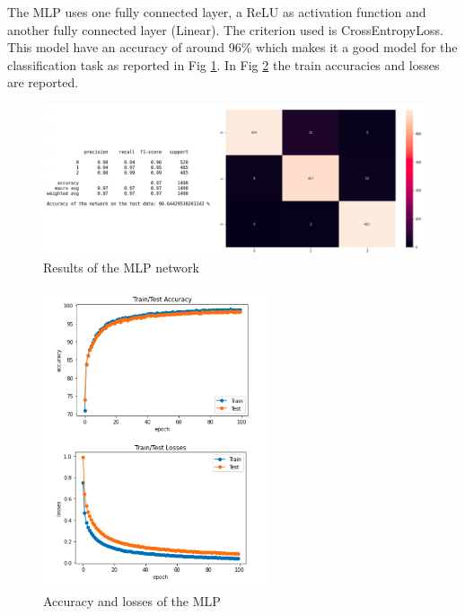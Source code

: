 \documentclass[a4paper,12pt]{article}
\begin{document}
\noindent The MLP uses one fully connected layer, a ReLU as activation function and another fully connected layer (Linear). The criterion used is CrossEntropyLoss. This model have an accuracy of around 96\% which makes it a good model for the classification task as reported in Fig \ref{fig:annres}. In Fig \ref{fig:anntrain} the train accuracies and losses are reported.

\begin{figure}[H]
  \begin{center}
  \includegraphics[width=1.0\textwidth]{images/ann_res.png}
  \end{center}
  \caption{Results of the MLP network}
  \label{fig:annres}
\end{figure}


\begin{figure}[H]
  \begin{center}
  \includegraphics[width=0.6\textwidth]{images/ann_train.png}
  \end{center}
  \caption{Accuracy and losses of the MLP}
  \label{fig:anntrain}
\end{figure}
\end{document}
